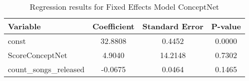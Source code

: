 \begin{table}[htbp]
\centering
\caption{Regression results for Fixed Effects Model ConceptNet}
\begin{tabular}{lccc}
\hline
Variable & Coefficient & Standard Error & P-value \\ 
\hline
const & 32.8808 & 0.4452 & 0.0000 \\ 
ScoreConceptNet & 4.9040 & 14.2148 & 0.7302 \\ 
count_songs_released & -0.0675 & 0.0464 & 0.1465 \\ 
\hline
\end{tabular}
\end{table}
